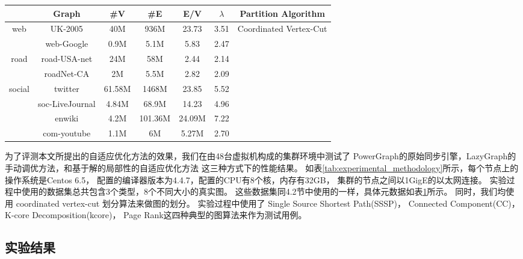 \begin{table}[htb]
  \centering
  \label{tab:experimental_data_set_and_partition_algorithm}
    \begin{tabular}{ccccccc}
     \toprule[1.5pt]
     & \textbf{Graph} & \textbf{\#V} & \textbf{\#E} & \textbf{E/V} & \textbf{$\lambda$} & {\textbf{Partition Algorithm}} \\
     \midrule[1pt]
     \multirow{2}{*}{web} & UK-2005 & 40M & 936M & 23.73 & 3.51 & \multirow{8}{*}{Coordinated Vertex-Cut } \\
                                         & web-Google & 0.9M & 5.1M & 5.83 & 2.47 \\
     \cmidrule(lr){1-6}
      \multirow{2}{*}{road} & road-USA-net & 24M & 58M & 2.44 & 2.14 \\
                                          & roadNet-CA & 2M & 5.5M & 2.82 & 2.09 \\
      \cmidrule(lr){1-6}
      \multirow{4}{*}{social} & twitter & 61.58M & 1468M & 23.85 & 5.52 \\
                                          & soc-LiveJournal & 4.84M & 68.9M & 14.23 & 4.96 \\
                                          & enwiki & 4.2M & 101.36M & 24.09M & 7.22 \\
                                          & com-youtube & 1.1M & 6M & 5.27M & 2.70 \\
     \bottomrule[1.5pt]
    \end{tabular}
\end{table}

为了评测本文所提出的自适应优化方法的效果，我们在由48台虚拟机构成的集群环境中测试了
PowerGraph的原始同步引擎，LazyGraph的手动调优方法，和基于解的局部性的自适应优化方法
这三种方式下的性能结果。
如表\ref{tab:experimental_methodology}所示，每个节点上的操作系统是Centos 6.5，
配置的编译器版本为4.4.7，配置的CPU有8个核，内存有32GB，
集群的节点之间以1GigE的以太网连接。
实验过程中使用的数据集总共包含3个类型，8个不同大小的真实图。
这些数据集同4.2节中使用的一样，具体元数据如表\ref{tab:experimental_data_set_and_partition_algorithm}所示。
同时，我们均使用 coordinated vertex-cut 划分算法来做图的划分。
实验过程中使用了
Single Source Shortest Path(SSSP)， 
Connected Component(CC)，
K-core Decomposition(kcore)， 
Page Rank这四种典型的图算法来作为测试用例。


\subsection{实验结果}

